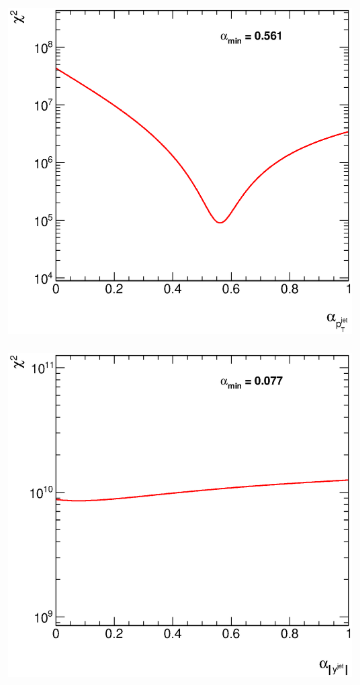 \documentclass[12pt, twoside]{article}
\numberwithin{equation}{section}
\numberwithin{figure}{section}
\newenvironment{changemargin}[2]{%
\begin{list}{}{%
\setlength{\topsep}{0pt}%
\setlength{\leftmargin}{#1}%
\setlength{\rightmargin}{#2}%
\setlength{\listparindent}{\parindent}%
\setlength{\itemindent}{\parindent}%
\setlength{\parsep}{\parskip}%
}%
\item[]}{\end{list}}
\begin{document}
\begin{figure}[H]
\begin{changemargin}{-0.5cm}{-0.0cm}
\begin{changemargin}{-0.0cm}{-0.5cm}
        \begin{subfigure}[b]{0.33\textwidth}
            \includegraphics[width=\textwidth]{./images/ChiSquareTest/CHI2-104.eps}
            \subcaption{}
            \label{fig:ChiSquarePtJet}
        \end{subfigure}
        \begin{subfigure}[b]{0.33\textwidth}
            \includegraphics[width=\textwidth]{./images/ChiSquareTest/CHI2-105.eps}

\end{subfigure}
\end{changemargin}
\end{changemargin}
\end{figure}
\end{document}
